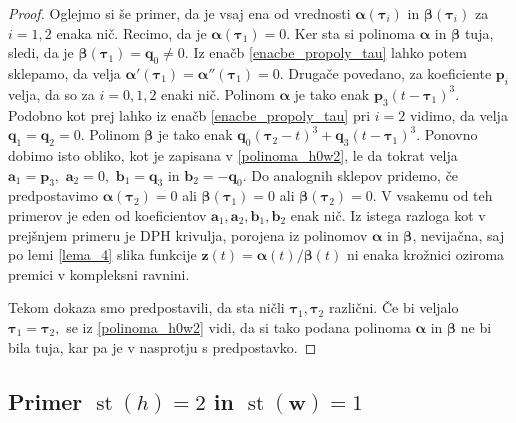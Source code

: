 \documentclass[12pt,a4paper,twoside]{article}
\theoremstyle{definition} %
\theoremstyle{plain} %
\theoremstyle{primerstyle}
\numberwithin{equation}{section}  %
\newcommand{\aV}{\mathbf{a}}
\newcommand{\bV}{\mathbf{b}}
\newcommand{\pV}{\mathbf{p}}
\newcommand{\qV}{\mathbf{q}}
\newcommand{\wV}{\mathbf{w}}
\newcommand{\zV}{\mathbf{z}}
\newcommand{\balpha}{\boldsymbol \alpha}
\newcommand{\bbeta}{\boldsymbol \beta}
\newcommand{\btau}{\boldsymbol \tau}
\DeclareMathOperator{\st}{st}
\begin{document}
\begin{proof}
	Oglejmo si še primer, da je vsaj ena od vrednosti $\balpha(\btau_i)$ in $\bbeta(\btau_i)$ za $i=1,2$ enaka nič. Recimo, da je $\balpha(\btau_1)=0.$ Ker sta si polinoma $\balpha$ in $\bbeta$ tuja, sledi, da je $\bbeta(\btau_1)=\qV_0\neq0.$ Iz enačb \eqref{enacbe_propoly_tau} lahko potem sklepamo, da velja $\balpha'(\btau_1)=\balpha''(\btau_1)=0.$ Drugače povedano, za koeficiente $\pV_i$ velja, da so za $i=0,1,2$ enaki nič. Polinom $\balpha$ je tako enak $\pV_3(t-\btau_1)^3.$ Podobno kot prej lahko iz enačb \eqref{enacbe_propoly_tau} pri $i=2$ vidimo, da velja $\qV_1=\qV_2=0.$ Polinom $\bbeta$ je tako enak $\qV_0(\btau_2-t)^3+\qV_3(t-\btau_1)^3.$ Ponovno dobimo isto obliko, kot je zapisana v \eqref{polinoma_h0w2}, le da tokrat velja $\aV_1=\pV_3,$ $\aV_2=0,$ $\bV_1=\qV_3$ in $\bV_2=-\qV_0.$ Do analognih sklepov pridemo, če predpostavimo $\balpha(\btau_2)=0$ ali $\bbeta(\btau_1)=0$ ali $\bbeta(\btau_2)=0.$ V vsakemu od teh primerov je eden od koeficientov $\aV_1,\aV_2,\bV_1,\bV_2$ enak nič. Iz istega razloga kot v prejšnjem primeru je DPH krivulja, porojena iz polinomov $\balpha$ in $\bbeta$, nevijačna, saj po lemi \ref{lema_4} slika funkcije $\zV(t)=\balpha(t)/\bbeta(t)$ ni enaka krožnici oziroma premici v kompleksni ravnini.
	
	Tekom dokaza smo predpostavili, da sta ničli $\btau_1,\btau_2$ različni. Če bi veljalo $\btau_1=\btau_2,$ se iz \eqref{polinoma_h0w2} vidi, da si tako podana polinoma $\balpha$ in $\bbeta$ ne bi bila tuja, kar pa je v nasprotju s predpostavko.
\end{proof}

\subsection{Primer \texorpdfstring{$\st(h)=2$}{st(h)=2} in \texorpdfstring{$\st(\wV)=1$}{st(w)=1}}
\label{locevanje_h2w1}
\end{document}
